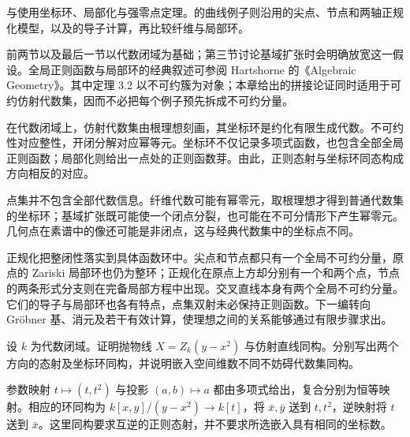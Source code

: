 与使用坐标环、局部化与强零点定理。的曲线例子则沿用的尖点、节点和两轴正规化模型，以及的导子计算，再比较纤维与局部环。

\ProseParagraphBreak
前两节以及最后一节以代数闭域为基础；第三节讨论基域扩张时会明确放宽这一假设。全局正则函数与局部环的经典叙述可参阅 Hartshorne 的《Algebraic Geometry》\cite[Chapter I, \S 3, pp. 14--18]{Hartshorne1977}。其中定理 3.2 以不可约簇为对象；本章给出的拼接论证同时适用于可约仿射代数集，因而不必把每个例子预先拆成不可约分量。






\begin{chaptersummary}
	在代数闭域上，仿射代数集由根理想刻画，其坐标环是约化有限生成代数。不可约性对应整性，开闭分解对应幂等元。坐标环不仅记录多项式函数，也包含全部全局正则函数；局部化则给出一点处的正则函数芽。由此，正则态射与坐标环同态构成方向相反的对应。

	\ProseParagraphBreak
	点集并不包含全部代数信息。纤维代数可能有幂零元，取根理想才得到普通代数集的坐标环；基域扩张既可能使一个闭点分裂，也可能在不可分情形下产生幂零元。几何点在素谱中的像还可能是非闭点，这与经典代数集中的坐标点不同。

	\ProseParagraphBreak
	正规化把整闭性落实到具体函数环中。尖点和节点都只有一个全局不可约分量，原点的 Zariski 局部环也仍为整环；正规化在原点上方却分别有一个和两个点，节点的两条形式分支则在完备局部方程中出现。交叉直线本身有两个全局不可约分量。它们的导子与局部环也各有特点，点集双射未必保持正则函数。下一编转向 Gröbner 基、消元及若干有效计算，使理想之间的关系能够通过有限步骤求出。
\end{chaptersummary}

\BookExercises

\begin{exercise}\label{b3:ex:07-parabola}
	设 \(k\) 为代数闭域。证明抛物线 \(X=Z_k(y-x^2)\) 与仿射直线同构。分别写出两个方向的态射及坐标环同构，并说明嵌入空间维数不同不妨碍代数集同构。
\end{exercise}
\begin{solution}
	参数映射 \(t\mapsto(t,t^2)\) 与投影 \((a,b)\mapsto a\) 都由多项式给出，复合分别为恒等映射。相应的环同构为 \(k[x,y]/(y-x^2)\to k[t]\)，将 \(\bar x,\bar y\) 送到 \(t,t^2\)，逆映射将 \(t\) 送到 \(\bar x\)。这里同构要求互逆的正则态射，并不要求所选嵌入具有相同的坐标数。
\end{solution}

